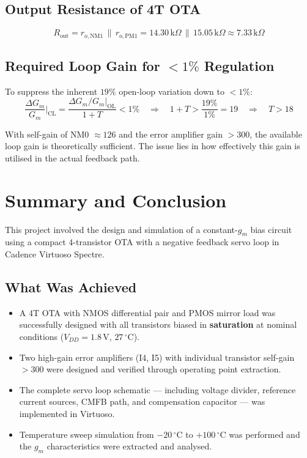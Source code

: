 \documentclass[12pt,a4paper]{article}
\begin{document}
\subsection{Output Resistance of 4T OTA}

\begin{equation}
  R_{\text{out}} = r_{o,\text{NM1}} \,\|\, r_{o,\text{PM1}}
  = 14.30\,\text{k}\Omega \,\|\, 15.05\,\text{k}\Omega
  \approx 7.33\,\text{k}\Omega
\end{equation}

\subsection{Required Loop Gain for $< 1\%$ Regulation}

To suppress the inherent $19\%$ open-loop variation down to $< 1\%$:
\begin{equation}
  \frac{\Delta G_m}{G_m}\bigg|_{\text{CL}} =
  \frac{\Delta G_m / G_m|_{\text{OL}}}{1 + T}
  < 1\%
  \quad\Rightarrow\quad
  1 + T > \frac{19\%}{1\%} = 19
  \quad\Rightarrow\quad T > 18
\end{equation}

With self-gain of NM0 $\approx 126$ and the error amplifier gain $> 300$, the available
loop gain is theoretically sufficient. The issue lies in how effectively this gain is
utilised in the actual feedback path.



\section{Summary and Conclusion}

This project involved the design and simulation of a constant-$g_m$ bias circuit using a
compact 4-transistor OTA with a negative feedback servo loop in Cadence Virtuoso Spectre.

\subsection*{What Was Achieved}
\begin{itemize}[leftmargin=1.5em]
  \item A 4T OTA with NMOS differential pair and PMOS mirror load was successfully designed
        with all transistors biased in \textbf{saturation} at nominal conditions
        ($V_{DD} = 1.8\,\text{V}$, $27\,^\circ$C).
  \item Two high-gain error amplifiers (I4, I5) with individual transistor self-gain
        $> 300$ were designed and verified through operating point extraction.
  \item The complete servo loop schematic — including voltage divider, reference current
        sources, CMFB path, and compensation capacitor — was implemented in Virtuoso.
  \item Temperature sweep simulation from $-20\,^\circ$C to $+100\,^\circ$C was performed
        and the $g_m$ characteristics were extracted and analysed.
\end{itemize}
\end{document}
